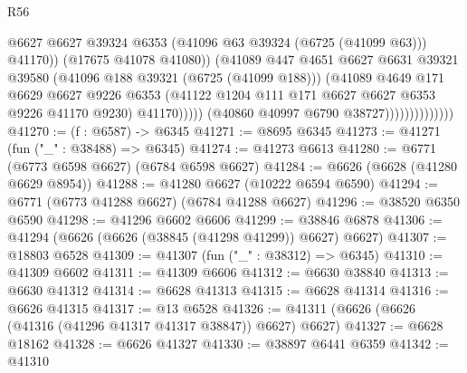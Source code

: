\begin{lexlean}{R56}
\begin{coremodule}
                                          @6627
                                          @6627
                                          @39324
                                          @6353
                                          (@41096 @63 @39324 (@6725 (@41099 @63)))
                                          @41170))
                                      (@17675 @41078 @41080))
                                    (@41089
                                      @447
                                      @4651
                                      @6627
                                      @6631
                                      @39321
                                      @39580
                                      (@41096 @188 @39321 (@6725 (@41099 @188)))
                                      (@41089
                                        @4649
                                        @171
                                        @6629
                                        @6627
                                        @9226
                                        @6353
                                        (@41122
                                          @1204
                                          @111
                                          @171
                                          @6627
                                          @6627
                                          @6353
                                          @9226
                                          @41170
                                          @9230)
                                        @41170)))))
                              (@40860 @40997 @6790 @38727))))))))))))))
@41270 := (f : @6587) -> @6345
@41271 := @8695 @6345
@41273 := @41271 (fun ("_" : @38488) => @6345)
@41274 := @41273 @6613
@41280 := @6771 (@6773 @6598 @6627) (@6784 @6598 @6627)
@41284 := @6626 (@6628 (@41280 @6629 @8954))
@41288 := @41280 @6627 (@10222 @6594 @6590)
@41294 := @6771 (@6773 @41288 @6627) (@6784 @41288 @6627)
@41296 := @38520 @6350 @6590
@41298 := @41296 @6602 @6606
@41299 := @38846 @6878
@41306 := @41294 (@6626 (@6626 (@38845 (@41298 @41299)) @6627) @6627)
@41307 := @18803 @6528
@41309 := @41307 (fun ("_" : @38312) => @6345)
@41310 := @41309 @6602
@41311 := @41309 @6606
@41312 := @6630 @38840
@41313 := @6630 @41312
@41314 := @6628 @41313
@41315 := @6628 @41314
@41316 := @6626 @41315
@41317 := @13 @6528
@41326 := @41311 (@6626 (@6626 (@41316 (@41296 @41317 @41317 @38847)) @6627) @6627)
@41327 := @6628 @18162
@41328 := @6626 @41327
@41330 := @38897 @6441 @6359
@41342 := @41310

\end{coremodule}
\end{lexlean}

